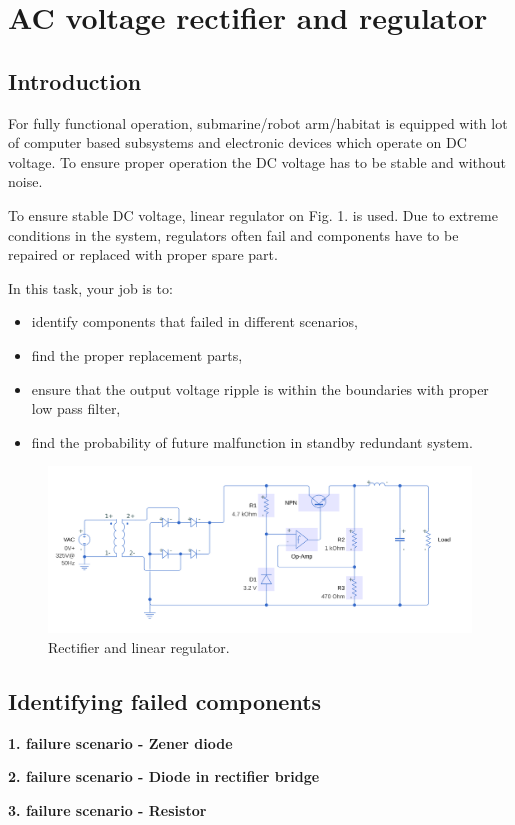 \documentclass[a4paper]{article}
\begin{document}
\section{AC voltage rectifier and regulator}

\subsection{Introduction}

For fully functional operation, submarine/robot arm/habitat is equipped with 
lot of computer based subsystems and electronic devices which operate on DC 
voltage. To ensure proper operation the DC voltage has to be stable and without 
noise.

To ensure stable DC voltage, linear regulator on Fig. 1. is used. Due to 
extreme conditions in the system, regulators often fail and components have to 
be repaired or replaced with proper spare part.

In this task, your job is to:
\begin{itemize}
\item identify components that failed in different scenarios, 
\item find the proper replacement parts, 
\item ensure that the output voltage ripple is within the boundaries with proper low pass filter,
\item find the probability of future malfunction in standby redundant system.
\end{itemize}



\begin{figure}[h!]
\centering
\includegraphics[width=\linewidth]{images/reg.png}

\caption{Rectifier and linear regulator.}
\end{figure}

\subsection{Identifying failed components}

\textbf{1. failure scenario - Zener diode}

\textbf{2. failure scenario - Diode in rectifier bridge}

\textbf{3. failure scenario - Resistor}
\end{document}
